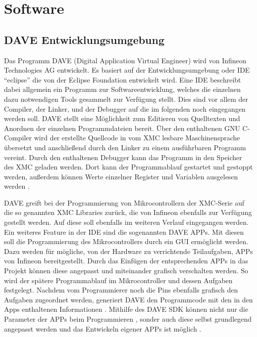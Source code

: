 \chapter{Software}
\label{sec:Software}
\pagestyle{scrheadings}
\section{DAVE Entwicklungsumgebung}

Das Programm DAVE (Digital Application Virtual Engineer) wird von Infineon Technologies AG entwickelt. Es basiert auf der Entwicklungsumgebung oder \ac{IDE} \enquote{eclipse} die von der Eclipse Foundation entwickelt wird. Eine \ac{IDE} beschreibt dabei allgemein ein Programm zur Softwareentwicklung, welches die einzelnen dazu notwendigen Tools gesammelt zur Verfügung stellt. Dies sind vor allem der Compiler, der Linker, und der Debugger auf die im folgenden noch eingegangen werden soll. DAVE stellt eine Möglichkeit zum Editieren von Quelltexten und Anordnen der einzelnen Programmdateien bereit. Über den enthaltenen GNU C-Compiler wird der erstellte Quellcode in vom XMC lesbare Maschinensprache übersetzt und anschließend durch den Linker zu einem ausführbaren Programm vereint. Durch den enthaltenen Debugger kann das Programm in den Speicher des XMC geladen werden. Dort kann der Programmablauf gestartet und gestoppt werden, außerdem können Werte einzelner Register und Variablen ausgelesen werden \cite{dausmann2011c}. 

DAVE greift bei der Programmierung von Mikrocontrollern der XMC-Serie auf die so genannten XMC Libraries zurück, die von Infineon ebenfalls zur Verfügung gestellt werden.  Auf diese soll ebenfalls im weiteren Verlauf  eingegangen werden. Ein weiteres Feature in der \ac{IDE} sind die sogenannten DAVE APPs. Mit diesen soll die Programmierung des Mikrocontrollers durch ein \ac{GUI} ermöglicht werden. Dazu werden für  mögliche, von der Hardware zu verrichtende Teilaufgaben, APPs von Infineon bereitgestellt. Durch das Einfügen der entsprechenden APPs in das Projekt können diese angepasst und miteinander grafisch verschalten werden. So wird der spätere Programmablauf im Mikrocontroller und dessen Aufgaben festgelegt. Nachdem vom Programmierer noch die Pins ebenfalls grafisch den Aufgaben zugeordnet werden, generiert  DAVE  den Programmcode mit den in den Apps enthaltenen Informationen \cite{DAVEQuickStart}.
Mithilfe des DAVE \ac{SDK} können nicht nur die Parameter der APPs beim Programmieren , sonder auch diese selbst grundlegend angepasst werden und das Entwickeln eigener APPs ist möglich \cite{DAVE-Version-4}.

